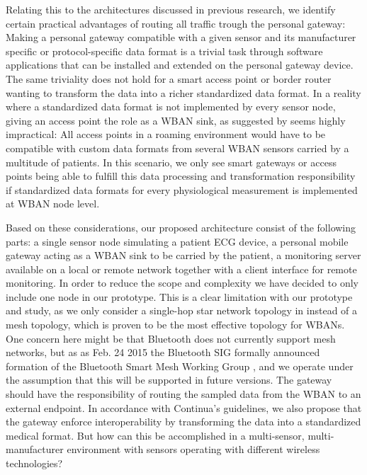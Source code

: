 Relating this to the architectures discussed in previous research, we identify certain practical advantages of routing all traffic trough the personal gateway: Making a personal gateway compatible with a given sensor and its manufacturer specific or protocol-specific data format is a trivial task through software applications that can be installed and extended on the personal gateway device. The same triviality does not hold for a smart access point or border router wanting to transform the data into a richer standardized data format. In a reality where a standardized data format is not implemented by every sensor node, giving an access point the role as a WBAN sink, as suggested by \cite{DrAmirMohammadRahmani:2014vx} seems highly impractical: All access points in a roaming environment would have to be compatible with custom data formats from several WBAN sensors carried by a multitude of patients. In this scenario, we only see smart gateways or access points being able to fulfill this data processing and transformation responsibility if standardized data formats for every physiological measurement is implemented at WBAN node level.

Based on these considerations, our proposed architecture consist of the following parts: a single sensor node simulating a patient ECG device, a personal mobile gateway acting as a WBAN sink to be carried by the patient, a monitoring server available on a local or remote network together with a client interface for remote monitoring. In order to reduce the scope and complexity we have decided to only include one node in our prototype. This is a clear limitation with our prototype and study, as we only consider a single-hop star network topology in instead of a mesh topology, which is proven to be the most effective topology for WBANs. One concern here might be that Bluetooth does not currently support mesh networks, but as as Feb. 24 2015 the Bluetooth SIG formally announced formation of the Bluetooth Smart Mesh Working Group \cite{bt:sig:mesh}, and we operate under the assumption that this will be supported in future versions. The gateway should have the responsibility of routing the sampled data from the WBAN to an external endpoint. In accordance with Continua's guidelines, we also propose that the gateway enforce interoperability by transforming the data into a standardized medical format. But how can this be accomplished in a multi-sensor, multi-manufacturer environment with sensors operating with different wireless technologies? 

